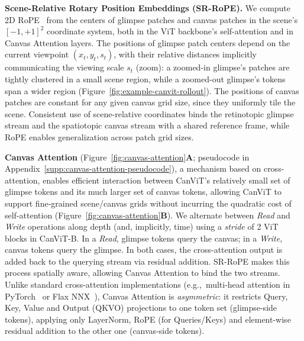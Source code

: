 \documentclass{article}
\begin{document}
\textbf{Scene-Relative Rotary Position Embeddings (SR-RoPE).}
We compute 2D \acs{RoPE}~\cite{suRoFormerEnhancedTransformer2024,heoRotaryPositionEmbedding2025}
from the centers of glimpse patches and canvas patches
in the scene's $[-1,+1]^2$ coordinate system,
both in the ViT backbone's self-attention and in Canvas Attention layers.
The positions of glimpse patch centers depend on the current viewpoint $(x_t, y_t, s_t)$,
with their relative distances implicitly communicating the viewing scale $s_t$ (zoom):
a zoomed-in glimpse's patches are tightly clustered in a small scene region,
while a zoomed-out glimpse's tokens span a wider region (Figure~\ref{fig:example-canvit-rollout}).
The positions of canvas patches are constant for any given canvas grid size,
since they uniformly tile the scene.
Consistent use of scene-relative coordinates
binds the retinotopic glimpse stream and the spatiotopic canvas stream
with a shared reference frame,
while \ac{RoPE} enables generalization across patch grid sizes.


\textbf{Canvas Attention} (Figure~\ref{fig:canvas-attention}\textbf{A}; pseudocode in Appendix~\ref{supp:canvas-attention-pseudocode}),
a mechanism based on cross-attention,
enables efficient interaction between CanViT's relatively small set of glimpse tokens
and its much larger set of canvas tokens,
allowing CanViT to support fine-grained scene/canvas grids without incurring the quadratic cost of self-attention (Figure~\ref{fig:canvas-attention}\textbf{B}).
We alternate between \emph{Read} and \emph{Write} operations
along depth (and, implicitly, time)
using a \emph{stride} of 2 ViT blocks in CanViT-B.
In a \emph{Read}, glimpse tokens query the canvas;
in a \emph{Write}, canvas tokens query the glimpse.
In both cases, the cross-attention output is added back to the querying stream via residual addition.
SR-RoPE makes this process spatially aware,
allowing Canvas Attention to bind the two streams.
Unlike standard cross-attention implementations
(e.g.,~multi-head attention in PyTorch~\cite{anselPyTorch2Faster2024} or Flax NNX~\cite{jax2018github,flax2020github}),
Canvas Attention is \emph{asymmetric}: it restricts Query, Key, Value and Output (QKVO) projections
to one token set (glimpse-side tokens),
applying only LayerNorm, RoPE (for Queries/Keys) and element-wise residual addition
to the other one (canvas-side tokens).
\end{document}
